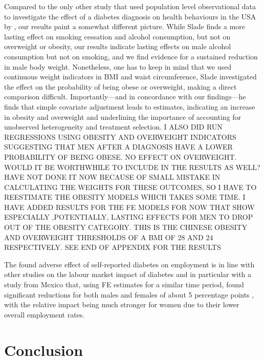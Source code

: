 Compared to the only other study that used population level observational data to investigate the effect of a diabetes diagnosis on health behaviours in the USA by \textcite{Slade2012}, our results paint a somewhat different picture. While Slade finds a more lasting effect on smoking cessation and alcohol consumption, but not on overweight or obesity, our results indicate lasting effects on male alcohol consumption but not on smoking, and we find evidence for a sustained reduction in male body weight. Nonetheless, one has to keep in mind that we used continuous weight indicators in \ac{BMI} and waist circumference, Slade investigated the effect on the probability of being obese or overweight, making a direct comparison difficult. Importantly---and in concordance with our findings---he finds that simple covariate adjustment leads to estimates, indicating an increase in obesity and overweight and underlining the importance of accounting for unobserved heterogeneity and treatment selection. I ALSO DID RUN REGRESSIONS USING OBESITY AND OVERWEIGHT INDICATORS SUGGESTING THAT MEN AFTER A DIAGNOSIS HAVE A LOWER PROBABILITY OF BEING OBESE. NO EFFECT ON OVERWEIGHT. WOULD IT BE WORTHWHILE TO INCLUDE IN THE RESULTS AS WELL? HAVE NOT DONE IT NOW BECAUSE OF SMALL MISTAKE IN CALCULATING THE WEIGHTS FOR THESE OUTCOMES, SO I HAVE TO REESTIMATE THE OBESITY MODELS WHICH TAKES SOME TIME. I HAVE ADDED RESULTS FOR THE FE MODELS FOR NOW THAT SHOW ESPECIALLY ,POTENTIALLY, LASTING EFFECTS FOR MEN TO DROP OUT OF THE OBESITY CATEGORY. THIS IS THE CHINESE OBESITY AND OVERWEIGHT THRESHOLDS OF A BMI OF 28 AND 24 RESPECTIVELY. SEE END OF APPENDIX FOR THE RESULTS

The found adverse effect of self-reported diabetes on employment is in line with other studies on the labour market impact of diabetes and in particular with a study from Mexico that, using \ac{FE} estimates for a similar time period, found significant reductions for both males and females of about 5 percentage points \parencite{Seuring2016}, with the relative impact being much stronger for women due to their lower overall employment rates.

\section{Conclusion}


